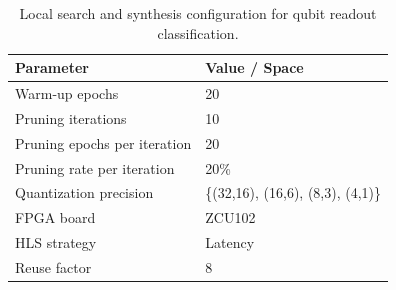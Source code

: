 \documentclass[11pt]{article}
\begin{document}
\begin{table}[H]
  \caption{Local search and synthesis configuration for qubit readout classification.}
  \label{tab:qubit-local-search-table}
  \centering
  \small
  \renewcommand{\arraystretch}{1.2}
  \begin{tabular}{ll}
    \toprule
    \textbf{Parameter} & \textbf{Value / Space} \\
    \midrule
    Warm-up epochs & 20 \\
    Pruning iterations & 10 \\
    Pruning epochs per iteration & 20 \\
    Pruning rate per iteration & 20\% \\
    Quantization precision & \{(32,16), (16,6), (8,3), (4,1)\} \\
    FPGA board & ZCU102 \\
    HLS strategy & Latency \\
    Reuse factor & 8 \\
    \bottomrule
  \end{tabular}
\end{table}
\end{document}
